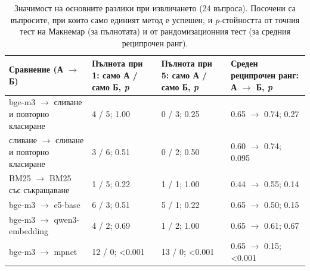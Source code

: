 \documentclass[12pt,a4paper]{article}
\begin{document}
\begin{table}[ht]
\centering
\small
\caption{Значимост на основните разлики при извличането (24 въпроса). Посочени са въпросите, при които само единият метод е успешен, и \textit{p}-стойността от точния тест на Макнемар (за пълнотата) и от рандомизационния тест (за средния реципрочен ранг).}
\label{tab:significance}
\setlength{\tabcolsep}{4pt}
\begin{tabular}{L{0.36\textwidth}C{0.17\textwidth}C{0.17\textwidth}C{0.2\textwidth}}
\toprule
Сравнение (А $\rightarrow$ Б) & Пълнота при 1: само А / само Б, \textit{p} & Пълнота при 5: само А / само Б, \textit{p} & Среден реципрочен ранг: А $\rightarrow$ Б, \textit{p}\\
\midrule
bge-m3 $\rightarrow$ сливане и повторно класиране & 4 / 5; 1.00 & 0 / 3; 0.25 & 0.65 $\rightarrow$ 0.74; 0.27\\
сливане $\rightarrow$ сливане и повторно класиране & 3 / 6; 0.51 & 0 / 2; 0.50 & 0.60 $\rightarrow$ 0.74; 0.095\\
BM25 $\rightarrow$ BM25 със съкращаване & 1 / 5; 0.22 & 1 / 1; 1.00 & 0.44 $\rightarrow$ 0.55; 0.14\\
bge-m3 $\rightarrow$ e5-base & 6 / 3; 0.51 & 5 / 1; 0.22 & 0.65 $\rightarrow$ 0.50; 0.15\\
bge-m3 $\rightarrow$ qwen3-embedding & 4 / 2; 0.69 & 1 / 2; 1.00 & 0.65 $\rightarrow$ 0.61; 0.67\\
bge-m3 $\rightarrow$ mpnet & 12 / 0; <0.001 & 13 / 0; <0.001 & 0.65 $\rightarrow$ 0.15; <0.001\\
\bottomrule
\end{tabular}
\end{table}
\end{document}

